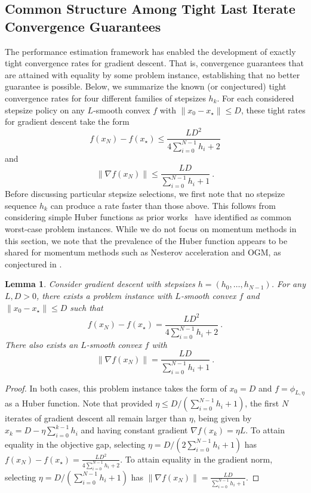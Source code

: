 \documentclass[11pt]{article}
\numberwithin{equation}{section}
\newtheorem{lemma}[thm]{Lemma}
\theoremstyle{definition}
\theoremstyle{definition}
\theoremstyle{definition}
\newcommand{\1}{\mathbf{1}}
\newcommand{\xStar}{x_\star}
\begin{document}
\subsection{Common Structure Among Tight Last Iterate Convergence Guarantees} \label{SubSec:Tight-Bounds}
The performance estimation framework has enabled the development of exactly tight convergence rates for gradient descent. That is, convergence guarantees that are attained with equality by some problem instance, establishing that no better guarantee is possible. Below, we summarize the known (or conjectured) tight convergence rates for four different families of stepsizes $h_k$.
For each considered stepsize policy on any $L$-smooth convex $f$ with $\|x_0-\xStar\|\leq D$, these tight rates for gradient descent take the form
\begin{equation}\label{Eqn:ObjGapRate}
    f(x_N)-f(\xStar) \leq \frac{LD^2}{4\sum_{i=0}^{N-1} h_i +2}
\end{equation}
and
\begin{equation}\label{Eqn:GradNormRate}
    \|\nabla f(x_N)\| \leq \frac{LD}{\sum_{i=0}^{N-1} h_i +1} \ .
\end{equation}
Before discussing particular stepsize selections, we first note that no stepsize sequence $h_k$ can produce a rate faster than those above. This follows from considering simple Huber functions as prior works~\cite{FirstPEP,OGM,Interpolation,Interpolation2,Teboulle_4T_Analytical} have identified as common worst-case problem instances. While we do not focus on momentum methods in this section, we note that the prevalence of the Huber function appears to be shared for momentum methods such as Nesterov acceleration and OGM, as conjectured in \cite{Interpolation}.
\begin{lemma}\label{Lem:Huber-Tightness}
    Consider gradient descent with stepsizes $h = (h_0, \dots, h_{N-1})$. For any $L,D>0$, there exists a problem instance with $L$-smooth convex $f$ and $\|x_0-\xStar\|\leq D$ such that
    $$ f(x_N)-f(\xStar) = \frac{LD^2}{4\sum_{i=0}^{N-1} h_i +2} \ . $$
    There also exists an $L$-smooth convex $f$ with
    $$ \|\nabla f(x_N)\| = \frac{LD}{\sum_{i=0}^{N-1} h_i +1} \ . $$
\end{lemma}
\begin{proof}
    In both cases, this problem instance takes the form of $x_0=D$ and $f = \phi_{L,\eta}$ as a Huber function. Note that provided $\eta \leq D/(\sum_{i=0}^{N-1} h_i+1)$, the first $N$ iterates of gradient descent all remain larger than $\eta$, being given by $x_k = D - \eta \sum_{i=0}^{k-1} h_i$ and having constant gradient $\nabla f(x_k) = \eta L$.
    To attain equality in the objective gap, selecting $\eta = D/(2\sum_{i=0}^{N-1} h_i+1)$ has $f(x_N)-f(\xStar) = \frac{LD^2}{4\sum_{i=0}^{N-1} h_i +2}$.     
    To attain equality in the gradient norm, selecting $\eta = D/(\sum_{i=0}^{N-1} h_i+1)$ has $\|\nabla f(x_N)\| = \frac{LD}{\sum_{i=0}^{N-1} h_i +1}$.
\end{proof}
\end{document}
